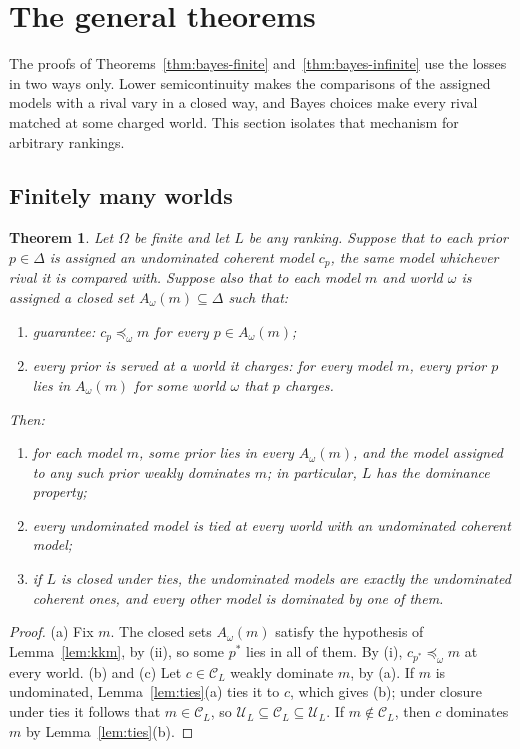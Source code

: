 \documentclass[11pt]{article}
\newtheorem{theorem}{Theorem}[section]
\theoremstyle{definition}
\theoremstyle{remark}
\newcommand{\C}{\mathcal C}
\newcommand{\U}{\mathcal U}
\begin{document}
\section{The general theorems}\label{sec:general}

The proofs of Theorems~\ref{thm:bayes-finite} and~\ref{thm:bayes-infinite} use the losses in two ways only. Lower semicontinuity makes the comparisons of the assigned models with a rival vary in a closed way, and Bayes choices make every rival matched at some charged world. This section isolates that mechanism for arbitrary rankings.

\subsection{Finitely many worlds}
\begin{theorem}\label{thm:finite}
Let $\Omega$ be finite and let $L$ be any ranking. Suppose that to each prior $p\in\Delta$ is assigned an undominated coherent model $c_p$, the same model whichever rival it is compared with. Suppose also that to each model $m$ and world $\omega$ is assigned a closed set $A_\omega(m)\subseteq\Delta$ such that:
\begin{enumerate}[label=(\roman*)]
\item \emph{guarantee}: $c_p\preceq_\omega m$ for every $p\in A_\omega(m)$;
\item \emph{every prior is served at a world it charges}: for every model $m$, every prior $p$ lies in $A_\omega(m)$ for some world $\omega$ that $p$ charges.
\end{enumerate}
Then:
\begin{enumerate}[label=(\alph*)]
\item for each model $m$, some prior lies in every $A_\omega(m)$, and the model assigned to any such prior weakly dominates $m$; in particular, $L$ has the dominance property;
\item every undominated model is tied at every world with an undominated coherent model;
\item if $L$ is closed under ties, the undominated models are exactly the undominated coherent ones, and every other model is dominated by one of them.
\end{enumerate}
\end{theorem}
\begin{proof}
(a) Fix $m$. The closed sets $A_\omega(m)$ satisfy the hypothesis of Lemma~\ref{lem:kkm}, by (ii), so some $p^*$ lies in all of them. By (i), $c_{p^*}\preceq_\omega m$ at every world. (b) and (c) Let $c\in\C_L$ weakly dominate $m$, by (a). If $m$ is undominated, Lemma~\ref{lem:ties}(a) ties it to $c$, which gives (b); under closure under ties it follows that $m\in\C_L$, so $\U_L\subseteq\C_L\subseteq\U_L$. If $m\notin\C_L$, then $c$ dominates $m$ by Lemma~\ref{lem:ties}(b).
\end{proof}
\end{document}
